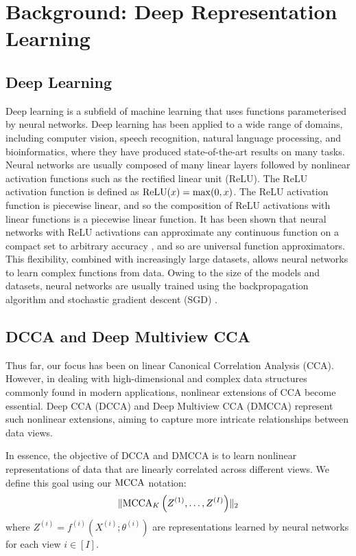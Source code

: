 \section{Background: Deep Representation Learning}

\subsection{Deep Learning}

Deep learning is a subfield of machine learning that uses functions parameterised by neural networks.
Deep learning has been applied to a wide range of domains, including computer vision, speech recognition, natural language processing, and bioinformatics, where they have produced state-of-the-art results on many tasks.
Neural networks are usually composed of many linear layers followed by nonlinear activation functions such as the rectified linear unit (ReLU).
The ReLU activation function is defined as $\operatorname{ReLU}(x) = \max(0, x)$.
The ReLU activation function is piecewise linear, and so the composition of ReLU activations with linear functions is a piecewise linear function.
It has been shown that neural networks with ReLU activations can approximate any continuous function on a compact set to arbitrary accuracy \citep{perekrestenko2018universal}, and so are universal function approximators.
This flexibility, combined with increasingly large datasets, allows neural networks to learn complex functions from data.
Owing to the size of the models and datasets, neural networks are usually trained using the backpropagation algorithm and stochastic gradient descent (SGD) \citep{amari1993backpropagation}.

\subsection{DCCA and Deep Multiview CCA}

Thus far, our focus has been on linear Canonical Correlation Analysis (CCA). However, in dealing with high-dimensional and complex data structures commonly found in modern applications, nonlinear extensions of CCA become essential.
Deep CCA (DCCA) and Deep Multiview CCA (DMCCA) represent such nonlinear extensions, aiming to capture more intricate relationships between data views.

In essence, the objective of DCCA and DMCCA is to learn nonlinear representations of data that are linearly correlated across different views.
We define this goal using our $\operatorname{MCCA}$ notation:
\begin{align}
    \label{eq:DMCCA-def}
    \lVert\operatorname{MCCA}_K\left(Z^{(1)}, \ldots, Z^{(I)}\right)\rVert_2
\end{align}
where $Z^{(i)} = f^{(i)}(X^{(i)}; \theta^{(i)})$ are representations learned by neural networks for each view $i \in [I]$.

